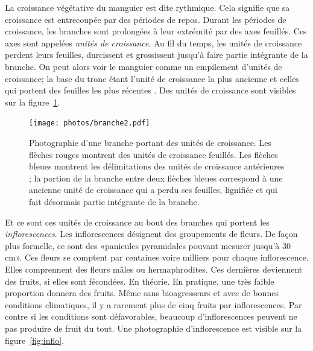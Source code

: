 La croissance végétative du manguier est dite rythmique.
Cela signifie que sa croissance est entrecoupée par des périodes de repos.
Durant les périodes de croissance, les branches sont prolongées à leur extrémité par des axes feuillés.
Ces axes sont appelées \emph{unités de croissance}. 
Au fil du temps, les unités de croissance perdent leurs feuilles, durcissent et grossissent jusqu'à faire partie intégrante de la branche.
On peut alors voir le manguier comme un empilement d'unités de croissance;
la base du tronc étant l'unité de croissance la plus ancienne et celles qui portent des feuilles les plus récentes \citep{normand2009}.
Des unités de croissance sont visibles sur la figure~\ref{fig:uc}.
\begin{figure}[ht]
 \centering
 \texttt{[image: photos/branche2.pdf]}
 \caption{Photographie d'une branche portant des unités de croissance. Les flèches rouges montrent des unités de croissance feuillés. Les flèches bleues montrent les délimitations des unités de croissance antérieures ; la portion de la branche entre deux flèches bleues correspond à une ancienne unité de croissance qui a perdu ses feuilles, lignifiée et qui fait désormais partie intégrante de la branche.}
 \label{fig:uc}
\end{figure}


\newpage

Et ce sont ces unités de croissance au bout des branches qui portent les \emph{inflorescences}.
Les inflorescences désignent des groupements de fleurs. De façon plus formelle, ce sont des «panicules pyramidales pouvant mesurer jusqu’à 30 cm».
Ces fleurs se comptent par centaines voire milliers pour chaque inflorescence. 
Elles comprennent des fleurs mâles ou hermaphrodites.
Ces dernières deviennent des fruits, si elles sont fécondées.
En théorie.
En pratique, une très faible proportion donnera des fruits.
Même sans bioagresseurs et avec de bonnes conditions climatiques, il y a rarement plus de cinq fruits par inflorescences.
Par contre si les conditions sont défavorables, beaucoup d'inflorescences peuvent ne pas produire de fruit du tout.
Une photographie d'inflorescence est visible sur la figure~\ref{fig:inflo}.

